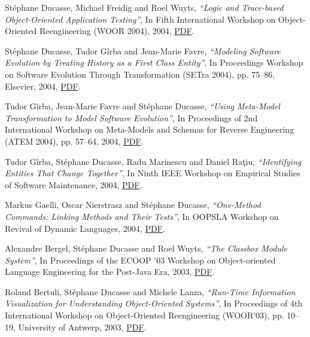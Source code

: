 \documentclass{article}
\newcommand{\czauthors}[1]{#1}
\newcommand{\cztitle}[1]{\emph{``#1''}}
\newcommand{\czbooktitle}[1]{#1}
\begin{document}
\begin{itemize}
	\pub  \czauthors{St\'ephane Ducasse, Michael Freidig and Roel Wuyts},  \cztitle{Logic and Trace-based Object-Oriented Application Testing},  In \czbooktitle{Fifth International Workshop on Object-Oriented Reengineering (WOOR 2004)}, 2004, \href{http://rmod-files.lille.inria.fr/Team/Texts/Papers/Duca04bTestLogicWoor04.pdf}{PDF}.

	\pub  \czauthors{St\'ephane Ducasse, Tudor G\^irba and Jean-Marie Favre},  \cztitle{Modeling Software Evolution by Treating History as a First Class Entity},  In \czbooktitle{Proceedings Workshop on Software Evolution Through Transformation (SETra 2004)}, pp. 75--86, Elsevier, 2004, \href{http://rmod-files.lille.inria.fr/Team/Texts/Papers/Duca04fHismo.pdf}{PDF}.

	\pub  \czauthors{Tudor G\^irba, Jean-Marie Favre and St\'ephane Ducasse},  \cztitle{Using Meta-Model Transformation to Model Software Evolution},  In \czbooktitle{Proceedings of 2nd International Workshop on Meta-Models and Schemas for Reverse Engineering (ATEM 2004)}, pp. 57--64, 2004, \href{http://rmod-files.lille.inria.fr/Team/Texts/Papers/Girb05bMetaModelTransATEM2004.pdf}{PDF}.

	\pub  \czauthors{Tudor G\^irba, St\'ephane Ducasse, Radu Marinescu and Daniel Ra\c{t}iu},  \cztitle{Identifying Entities That Change Together},  In \czbooktitle{Ninth IEEE Workshop on Empirical Studies of Software Maintenance}, 2004, \href{http://rmod-files.lille.inria.fr/Team/Texts/Papers/Girb04dEntitiesChangeTogether.pdf}{PDF}.

	\pub  \czauthors{Markus Gaelli, Oscar Nierstrasz and St\'ephane Ducasse},  \cztitle{One-Method Commands: Linking Methods and Their Tests},  In \czbooktitle{OOPSLA Workshop on Revival of Dynamic Languages}, 2004, \href{http://rmod-files.lille.inria.fr/Team/Texts/Papers/Gael04c-LinkingMethodsAndTests.pdf}{PDF}.

	\pub  \czauthors{Alexandre Bergel, St\'ephane Ducasse and Roel Wuyts},  \cztitle{The {Classbox} Module System},  In \czbooktitle{Proceedings of the ECOOP '03 Workshop on Object-oriented Language Engineering for the Post-Java Era}, 2003, \href{http://rmod-files.lille.inria.fr/Team/Texts/Papers/Berg03b-Workshop-Classboxes.pdf}{PDF}.

	\pub  \czauthors{Roland Bertuli, St\'ephane Ducasse and Michele Lanza},  \cztitle{Run-Time Information Visualization for Understanding Object-Oriented Systems},  In \czbooktitle{Proceedings of 4th International Workshop on Object-Oriented Reengineering (WOOR'03)}, pp. 10--19, University of Antwerp, 2003, \href{http://rmod-files.lille.inria.fr/Team/Texts/Papers/Bert03aEcoop-Workshop.pdf}{PDF}.


\end{itemize}
\end{document}

